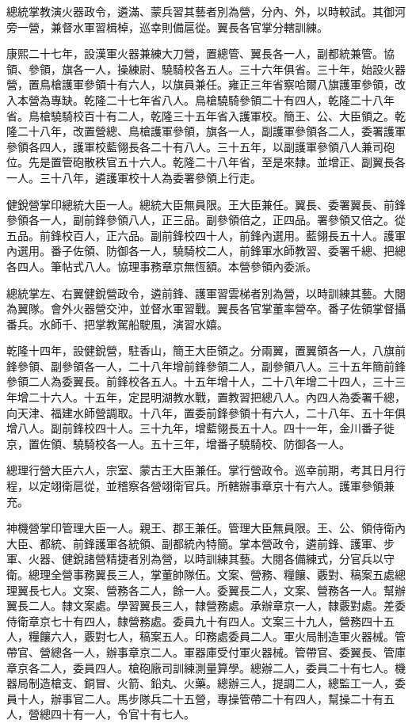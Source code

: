 \begin{pinyinscope}
總統掌教演火器政令，遴滿、蒙兵習其藝者別為營，分內、外，以時較試。其御河旁一營，兼督水軍習楫棹，巡幸則備扈從。翼長各官掌分轄訓練。

康熙二十七年，設漢軍火器兼練大刀營，置總管、翼長各一人，副都統兼管。協領、參領，旗各一人，操練尉、驍騎校各五人。三十六年俱省。三十年，始設火器營，置鳥槍護軍參領十有六人，以旗員兼任。雍正三年省察哈爾八旗護軍參領，改入本營為專缺。乾隆二十七年省八人。鳥槍驍騎參領二十有四人，乾隆二十八年省。鳥槍驍騎校百十有二人，乾隆三十五年省入護軍校。簡王、公、大臣領之。乾隆二十八年，改置營總、鳥槍護軍參領，旗各一人，副護軍參領各二人，委署護軍參領各四人，護軍校藍翎長各二十有八人。三十五年，以副護軍參領八人兼司砲位。先是置管砲散秩官五十六人。乾隆二十八年省，至是來隸。並增正、副翼長各一人。三十八年，遴護軍校十人為委署參領上行走。

健銳營掌印總統大臣一人。總統大臣無員限。王大臣兼任。翼長、委署翼長、前鋒參領各一人，副前鋒參領八人，正三品。副參領倍之，正四品。署參領又倍之。從五品。前鋒校百人，正六品。副前鋒校四十人，前鋒內選用。藍翎長五十人。護軍內選用。番子佐領、防御各一人，驍騎校二人，前鋒軍水師教習、委署千總、把總各四人。筆帖式八人。協理事務章京無恆額。本營參領內委派。

總統掌左、右翼健銳營政令，遴前鋒、護軍習雲梯者別為營，以時訓練其藝。大閱為翼隊。會外火器營交沖，並督水軍習戰。翼長各官掌董率營卒。番子佐領掌督攝番兵。水師千、把掌教駕船駛風，演習水嬉。

乾隆十四年，設健銳營，駐香山，簡王大臣領之。分兩翼，置翼領各一人，八旗前鋒參領、副參領各一人，二十八年增前鋒參領二人，副參領八人。三十五年簡前鋒參領二人為委翼長。前鋒校各五人。十五年增十人，二十八年增二十四人，三十三年增二十六人。十五年，定昆明湖教水戰，置教習把總八人。內四人為委署千總，向天津、福建水師營調取。十八年，置委前鋒參領十有六人，二十八年、五十年俱增八人。副前鋒校四十人。三十九年，增藍翎長五十人。四十一年，金川番子徙京，置佐領、驍騎校各一人。五十三年，增番子驍騎校、防御各一人。

總理行營大臣六人，宗室、蒙古王大臣兼任。掌行營政令。巡幸前期，考其日月行程，以定翊衛扈從，並稽察各營翊衛官兵。所轄辦事章京十有六人。護軍參領兼充。

神機營掌印管理大臣一人。親王、郡王兼任。管理大臣無員限。王、公、領侍衛內大臣、都統、前鋒護軍各統領、副都統內特簡。掌本營政令，遴前鋒、護軍、步軍、火器、健銳諸營精捷者別為營，以時訓練其藝。大閱各備練式，分官兵以守衛。總理全營事務翼長三人，掌董帥隊伍。文案、營務、糧饟、覈對、稿案五處總理翼長七人。文案、營務各二人，餘一人。委翼長二人，文案、營務各一人。幫辦翼長二人。隸文案處。學習翼長三人，隸營務處。承辦章京一人，隸覈對處。差委侍衛章京七十有四人，隸營務處。委員九十有四人。文案三十九人，營務四十五人，糧饟六人，覈對七人，稿案五人。印務處委員二人。軍火局制造軍火器械。管帶官、營總各一人，辦事章京二人。軍器庫受付軍火器械。管帶官、委翼長、管庫章京各二人，委員四人。槍砲廠司訓練測量算學。總辦二人，委員二十有七人。機器局制造槍支、銅冒、火箭、鉛丸、火藥。總辦三人，提調二人，總監工一人，委員十人，辦事官二人。馬步隊兵二十五營，專操管帶二十有四人，幫操二十有五人，營總四十有一人，令官十有七人。


\end{pinyinscope}
